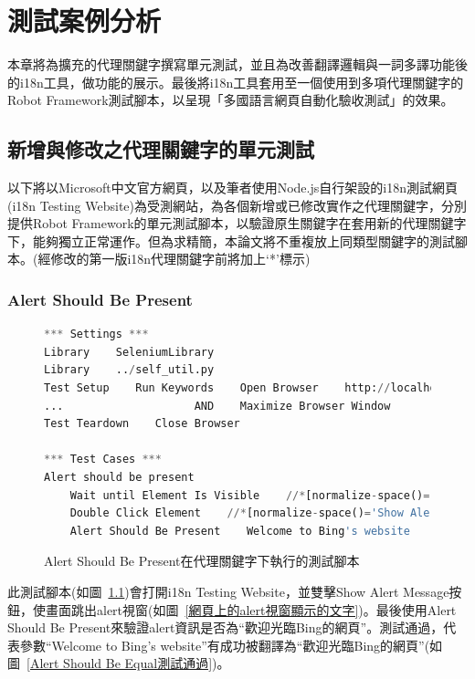 \chapter{測試案例分析}
本章將為擴充的代理關鍵字撰寫單元測試\cite{ut}，並且為改善翻譯邏輯與一詞多譯功能後的i18n工具，做功能的展示。最後將i18n工具套用至一個使用到多項代理關鍵字的Robot Framework測試腳本，以呈現「多國語言網頁自動化驗收測試」的效果。

\section{新增與修改之代理關鍵字的單元測試}
以下將以Microsoft中文官方網頁\cite{microsoft}，以及筆者使用Node.js\cite{nodejs}自行架設的i18n測試網頁(i18n Testing Website)為受測網站，為各個新增或已修改實作之代理關鍵字，分別提供Robot Framework的單元測試腳本，以驗證原生關鍵字在套用新的代理關鍵字下，能夠獨立正常運作。但為求精簡，本論文將不重複放上同類型關鍵字的測試腳本。(經修改的第一版i18n代理關鍵字前將加上‘*’標示)

\subsection{Alert Should Be Present}
\begin{figure}[H]
\begin{lstlisting}[language={python}]
*** Settings ***
Library    SeleniumLibrary
Library    ../self_util.py
Test Setup    Run Keywords    Open Browser    http://localhost:3000    Chrome
...                    AND    Maximize Browser Window
Test Teardown    Close Browser

*** Test Cases ***
Alert should be present
    Wait until Element Is Visible    //*[normalize-space()='Show Alert Message']    timeout=${shortPeriodOfTime}
    Double Click Element    //*[normalize-space()='Show Alert Message']
    Alert Should Be Present    Welcome to Bing's website
\end{lstlisting}
\caption{Alert Should Be Present在代理關鍵字下執行的測試腳本}
\label{Alert Should Be Present在代理關鍵字下執行的測試腳本}
\end{figure}
此測試腳本(如圖~\ref{Alert Should Be Present在代理關鍵字下執行的測試腳本})會打開i18n Testing Website，並雙擊Show Alert Message按鈕，使畫面跳出alert視窗(如圖~\ref{網頁上的alert視窗顯示的文字})。最後使用Alert Should Be Present來驗證alert資訊是否為“歡迎光臨Bing的網頁”。測試通過，代表參數“Welcome to Bing’s website”有成功被翻譯為“歡迎光臨Bing的網頁”(如圖~\ref{Alert Should Be Equal測試通過})。

